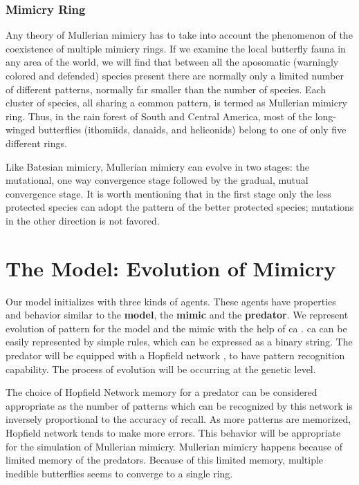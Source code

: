 \documentclass[letterpaper]{article}
\numberwithin{equation}{section}
\begin{document}
\subsubsection{Mimicry Ring}
Any theory of Mullerian mimicry has to take into account the phenomenon of the coexistence of multiple mimicry rings. If we examine the local butterfly fauna in any area of the world, we will find that between all the aposomatic (warningly colored and defended) species present there are normally only a limited number of different patterns, normally far smaller than the number of species. Each cluster of species, all sharing a common pattern, is termed as Mullerian mimicry ring. Thus, in the rain forest of South and Central America, most of the long-winged butterflies (ithomiids, danaids, and heliconids) belong to one of only five different rings.

Like Batesian mimicry, Mullerian mimicry can evolve in two stages: the mutational, one way convergence stage followed by the gradual, mutual convergence stage. It is worth mentioning that in the first stage only the less protected species can adopt the pattern of the better protected species; mutations in the other direction is not favored.

\section{The Model: Evolution of Mimicry}
\label{section:model}

Our model initializes with three kinds of agents. These agents have properties and behavior similar to the \textbf{model}, the \textbf{mimic} and the \textbf{predator}. We represent evolution of pattern for the model and the mimic with the help of \gls{ca} \citep{Wolfram2002}. \gls{ca} can be easily represented by simple rules, which can be expressed as a binary string. The predator will be equipped with a Hopfield network \citep{hopfield1982}, to have pattern recognition capability. The process of evolution will be occurring at the genetic level. 

The choice of Hopfield Network memory for a predator can be considered appropriate as the number of patterns which can be recognized by this network is inversely proportional to the accuracy of recall. As more patterns are memorized, Hopfield network tends to make more errors. This behavior will be appropriate for the simulation of Mullerian mimicry. Mullerian mimicry happens because of limited memory of the predators. Because of this limited memory, multiple inedible butterflies seems to converge to a single ring.
\end{document}
